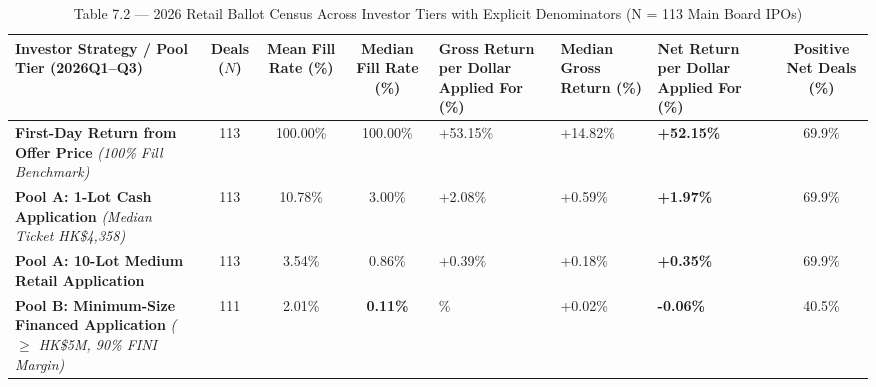 \documentclass[11pt,letterpaper]{article}
\begin{document}
\begin{table}[!htbp]
\centering
\caption*{Table 7.2 — 2026 Retail Ballot Census Across Investor Tiers with Explicit Denominators (N = 113 Main Board IPOs)}
\begin{adjustbox}{max width=\textwidth,max totalheight=0.79\textheight}
\begin{minipage}{\textwidth}\centering
\footnotesize
\setlength{\tabcolsep}{3.5pt}
\renewcommand{\arraystretch}{1.18}
\begin{adjustbox}{max width=\textwidth}
\begin{tabular}{>{\raggedright\arraybackslash}p{4.10cm}ccc>{\centering\arraybackslash}p{2.84cm}>{\centering\arraybackslash}p{1.90cm}>{\centering\arraybackslash}p{2.69cm}c}
\toprule
Investor Strategy / Pool Tier (2026Q1–Q3) & Deals ($N$) & Mean Fill Rate (\%) & Median Fill Rate (\%) & Gross Return per Dollar Applied For (\%) & Median Gross Return (\%) & Net Return per Dollar Applied For (\%) & Positive Net Deals (\%) \\
\midrule
\textbf{First-Day Return from Offer Price} \textit{(100\% Fill Benchmark)} & 113 & 100.00\% & 100.00\% & +53.15\% & +14.82\% & \textbf{+52.15\%} & 69.9\% \\
\textbf{Pool A: 1-Lot Cash Application} \textit{(Median Ticket HK\$4,358)} & 113 & 10.78\% & 3.00\% & +2.08\% & +0.59\% & \textbf{+1.97\%} & 69.9\% \\
\textbf{Pool A: 10-Lot Medium Retail Application} & 113 & 3.54\% & 0.86\% & +0.39\% & +0.18\% & \textbf{+0.35\%} & 69.9\% \\
\textbf{Pool B: Minimum-Size Financed Application} \textit{($\ge$ HK\$5M, 90\% FINI Margin)} & 111 & 2.01\% & \textbf{0.11\%} & -0.01\% & +0.02\% & \textbf{-0.06\%} & 40.5\% \\
\bottomrule
\end{tabular}
\end{adjustbox}
\end{minipage}
\end{adjustbox}

\end{table}
\end{document}
